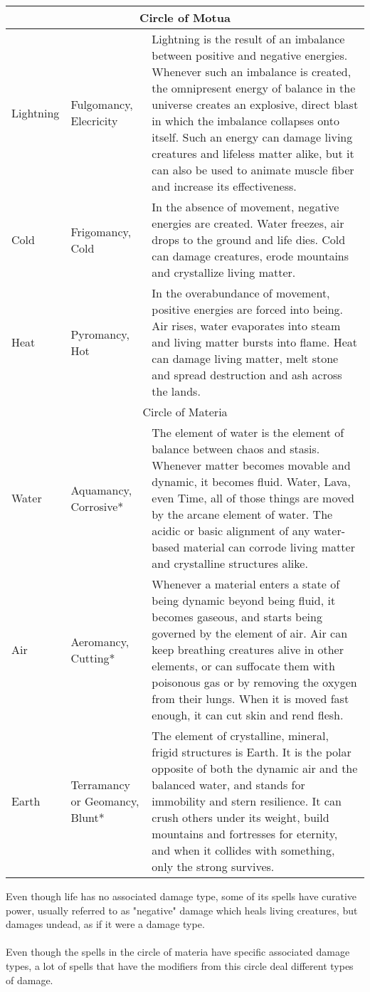 \begin{longtable}{l | p{2.5cm} | p{7.25cm}}
	\multicolumn{3}{c}{Circle of Motua}\\ \hline
	Lightning & Fulgomancy, Elecricity & 	Lightning is the result of an imbalance between positive and negative energies. Whenever such an imbalance is created, the omnipresent energy of balance in the universe creates an explosive, direct blast in which the imbalance collapses onto itself. Such an energy can damage living creatures and lifeless matter alike, but it can also be used to animate muscle fiber and increase its effectiveness. \\
	Cold & Frigomancy, Cold & 	In the absence of movement, negative energies are created. Water freezes, air drops to the ground and life dies. Cold can damage creatures, erode mountains and crystallize living matter.\\
	Heat & Pyromancy, Hot & In the overabundance of movement, positive energies are forced into being. Air rises, water evaporates into steam and living matter bursts into flame. Heat can damage living matter, melt stone and spread destruction and ash across the lands.\\
	
	\multicolumn{3}{c}{Circle of Materia}\\ \hline
	Water & Aquamancy, Corrosive* & The element of water is the element of balance between chaos and stasis. Whenever matter becomes movable and dynamic, it becomes fluid. Water, Lava, even Time, all of those things are moved by the arcane element of water. The acidic or basic alignment of any water-based material can corrode living matter and crystalline structures alike.\\
	Air & Aeromancy, Cutting* & Whenever a material enters a state of being dynamic beyond being fluid, it becomes gaseous, and starts being governed by the element of air. Air can keep breathing creatures alive in other elements, or can suffocate them with poisonous gas or by removing the oxygen from their lungs. When it is moved fast enough, it can cut skin and rend flesh. \\
	Earth & Terramancy or Geomancy, Blunt* & The element of crystalline, mineral, frigid structures is Earth. It is the polar opposite of both the dynamic air and the balanced water, and stands for immobility and stern resilience. It can crush others under its weight, build mountains and fortresses for eternity, and when it collides with something, only the strong survives.\\
\end{longtable}
\*Even though life has no associated damage type, some of its spells have curative power, usually referred to as "negative" damage which heals living creatures, but damages undead, as if it were a damage type.\\
\\
\*Even though the spells in the circle of materia have specific associated damage types, a lot of spells that have the modifiers from this circle deal different types of damage. \\